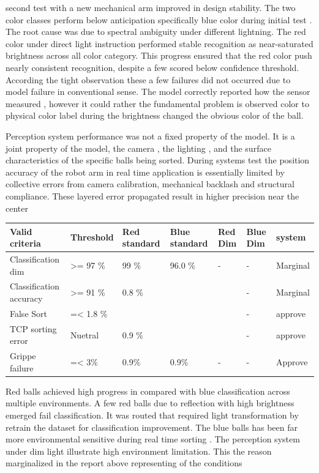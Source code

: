  second test with a new mechanical arm improved in design stability. The two color classes perform below anticipation specifically blue color during initial test . The root cause was due to spectral ambiguity under different lightning. The red color under direct light instruction performed stable recognition  as near-saturated brightness across all color category. This progress ensured that the red color push nearly consistent recognition, despite a few scored below confidence threshold. According the tight observation these a few failures did not occurred due to model failure in conventional sense. The model correctly reported how the sensor measured , however it could rather the fundamental problem is observed color to physical color label during the brightness changed the obvious color of the ball.

 Perception system performance was not a fixed property of the model. It is a joint property of the model, the camera , the lighting , and the surface  characteristics of the specific balls being sorted. During systems test the position accuracy of the robot arm in real time application is essentially limited by collective errors from camera calibration, mechanical backlash and structural compliance. These layered error propagated result in higher precision near the center 



\begin{table}
\centering

\begin{tabular}{| l | l | l | l | l | l | l |}
\hline
Valid criteria & Threshold  & Red standard & Blue standard & Red Dim & Blue Dim  & system \\
\hline
Classification dim & >= 97 \% & 99 \%  & 96.0 \%  & - & - & Marginal  \\
\hline
Classification accuracy  & >= 91 \% & 0.8 \% &   &   & - & Marginal  \\
\hline
False Sort  & =< 1.8 \% &   &   &   & - & approve \\
\hline
TCP sorting error & Nuetral  & 0.9 \% &   &   & - & approve \\
\hline
Grippe failure & =< 3\% & 0.9\% & 0.9\% & - & - & Approve  \\
\hline

\end{tabular}

\end{table}

 Red balls achieved high progress in compared with blue classification across multiple environments. A few red balls due to reflection with high brightness emerged fail classification. It was routed that required light transformation by retrain the dataset for classification improvement. The blue balls has been far more environmental sensitive during real time sorting . The perception system under dim light illustrate high environment limitation. This the reason marginalized in the report above representing of the conditions 

